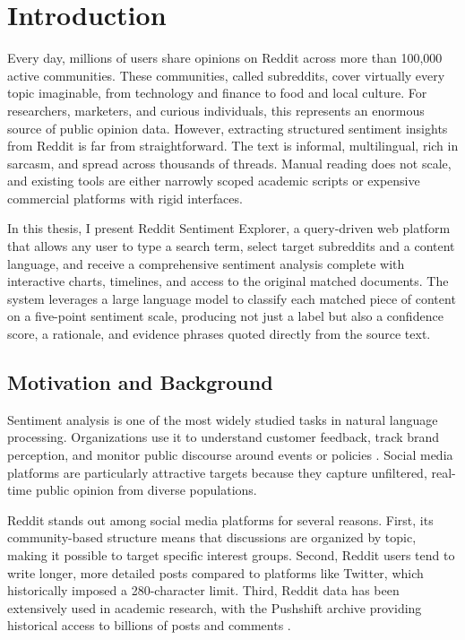 \chapter{Introduction}
\label{ch:introduction}

Every day, millions of users share opinions on Reddit across more than 100,000 active communities. These communities, called subreddits, cover virtually every topic imaginable, from technology and finance to food and local culture. For researchers, marketers, and curious individuals, this represents an enormous source of public opinion data. However, extracting structured sentiment insights from Reddit is far from straightforward. The text is informal, multilingual, rich in sarcasm, and spread across thousands of threads. Manual reading does not scale, and existing tools are either narrowly scoped academic scripts or expensive commercial platforms with rigid interfaces.

In this thesis, I present Reddit Sentiment Explorer, a query-driven web platform that allows any user to type a search term, select target subreddits and a content language, and receive a comprehensive sentiment analysis complete with interactive charts, timelines, and access to the original matched documents. The system leverages a large language model to classify each matched piece of content on a five-point sentiment scale, producing not just a label but also a confidence score, a rationale, and evidence phrases quoted directly from the source text.

\section{Motivation and Background}
\label{sec:motivation}

Sentiment analysis is one of the most widely studied tasks in natural language processing. Organizations use it to understand customer feedback, track brand perception, and monitor public discourse around events or policies \cite{liu2012sentiment}. Social media platforms are particularly attractive targets because they capture unfiltered, real-time public opinion from diverse populations.

Reddit stands out among social media platforms for several reasons. First, its community-based structure means that discussions are organized by topic, making it possible to target specific interest groups. Second, Reddit users tend to write longer, more detailed posts compared to platforms like Twitter, which historically imposed a 280-character limit. Third, Reddit data has been extensively used in academic research, with the Pushshift archive providing historical access to billions of posts and comments \cite{baumgartner2020pushshift}.

